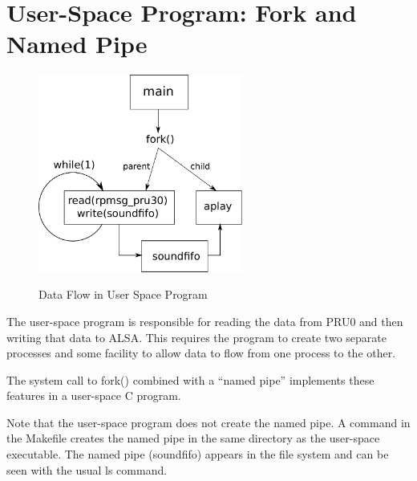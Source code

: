%
%
%

\chapter{User-Space Program: Fork and Named Pipe}

	\begin{figure}[h]
		\centering
		\includegraphics[width=0.6\textwidth]{diagrams/user_space_fork}
		\centering\bfseries
		\caption{Data Flow in User Space Program}
	\end{figure}
		
	The user-space program is responsible for reading the data from PRU0 and then writing that data to ALSA.
	This requires the program to create two separate processes and some facility to allow data to flow from one process to the other.
	
	The system call to fork() combined with a ``named pipe'' implements these features in a user-space C program.
	
	Note that the user-space program does not create the named pipe.  A command in the Makefile creates the named pipe in the same directory as the user-space executable.  The named pipe (soundfifo) appears in the file system and can be seen with the usual ls command.
	
